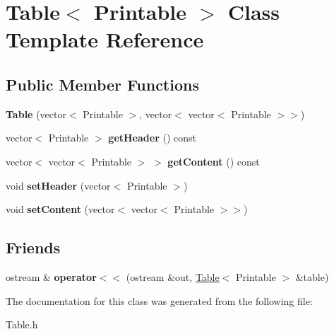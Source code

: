 \hypertarget{classTable}{}\section{Table$<$ Printable $>$ Class Template Reference}
\label{classTable}
\subsection*{Public Member Functions}
\begin{DoxyCompactItemize}
\item 
\mbox{\label{classTable_a5cd300115aa701bf1ce2b8b699bb8b67}} 
{\bfseries Table} (vector$<$ Printable $>$, vector$<$ vector$<$ Printable $>$$>$)
\item 
\mbox{\label{classTable_adfc18652c5a12074c711d0d130de1558}} 
vector$<$ Printable $>$ {\bfseries get\+Header} () const
\item 
\mbox{\label{classTable_a92b61c79d97dbaea5d84765724748290}} 
vector$<$ vector$<$ Printable $>$ $>$ {\bfseries get\+Content} () const
\item 
\mbox{\label{classTable_a157d11aed7639848be3df7f66907d7ce}} 
void {\bfseries set\+Header} (vector$<$ Printable $>$)
\item 
\mbox{\label{classTable_a3597b9cc888ea47992c356107860d579}} 
void {\bfseries set\+Content} (vector$<$ vector$<$ Printable $>$$>$)
\end{DoxyCompactItemize}
\subsection*{Friends}
\begin{DoxyCompactItemize}
\item 
\mbox{\label{classTable_a00477c3fef9d620e66d0ad9a56b5adcf}} 
ostream \& {\bfseries operator$<$$<$} (ostream \&out, \hyperlink{classTable}{Table}$<$ Printable $>$ \&table)
\end{DoxyCompactItemize}


The documentation for this class was generated from the following file\+:\begin{DoxyCompactItemize}
\item 
Table.\+h\end{DoxyCompactItemize}

